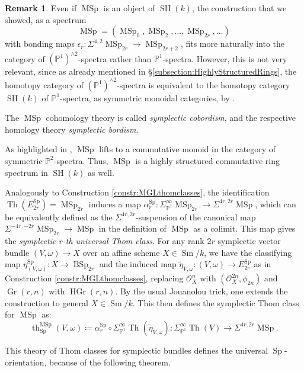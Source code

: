 \documentclass[10pt]{amsart}
\theoremstyle{definition}
\newtheorem{rmk}[defn]{Remark}
\theoremstyle{plain}
\numberwithin{equation}{section}
\newcommand{\0}{\emptyset}
\renewcommand{\P}{{\mathbb P}}
\newcommand{\MSp}{{\operatorname{MSp}}}
\newcommand{\BSp}{{\operatorname{BSp}}}
\newcommand{\Sp}{{\operatorname{Sp}}}
\newcommand{\Gr}{{\operatorname{Gr}}}
\newcommand{\HGr}{{\operatorname{HGr}}}
\newcommand{\SH}{{\operatorname{SH}}}
\newcommand{\Th}{{\operatorname{Th}}}
\newcommand{\Sm}{{\operatorname{Sm}}}
\renewcommand{\th}{{\operatorname{th}}}
\begin{document}
\begin{rmk}
    Even if $\MSp$ is an object of $\SH(k)$, the construction that we showed, as a spectrum
    $$\MSp=(\MSp_0, \MSp_2, \ldots, \MSp_{2r}, \ldots)$$
    with bonding maps $\epsilon_r:\Sigma^{4,2}\MSp_{2r} \to \MSp_{2r+2}$, fits more naturally into the category of $(\P^1)^{\wedge 2}$-spectra rather than $\P^1$-spectra. However, this is not very relevant, since as already mentioned in \S \ref{subsection:HighlyStructuredRings}, the homotopy category of $(\P^1)^{\wedge 2}$-spectra is equivalent to the homotopy category $\SH(k)$ of $\P^1$-spectra, as symmetric monoidal categories, by \cite[Theorem 3.2]{Panwal-cobordism}.
\end{rmk}

The $\MSp$ cohomology theory is called \emph{symplectic cobordism}, and the respective homology theory \emph{symplectic bordism}.  

As highlighted in \cite[Section 6]{Panwal-cobordism}, $\MSp$ lifts to a commutative monoid in the category of symmetric $\P^2$-spectra. Thus, $\MSp$ is a highly structured commutative ring spectrum in $\SH(k)$ as well.

Analogously to Construction \ref{constr:MGLthomclasses}, the identification $\Th(E_{2r}^\Sp)=\MSp_{2r}$ induces a map $\alpha_r^\Sp: \Sigma_{\P^1}^\infty \MSp_{2r}\to \Sigma^{4r,2r}\MSp$, which can be equivalently defined as the $\Sigma^{4r,2r}$-suspension of the canonical map $\Sigma^{-4r,-2r}\MSp_{2r} \to \MSp$ in the definition of $\MSp$ as a colimit. This map gives the \emph{symplectic $r$-th universal Thom class}. For any rank $2r$ symplectic vector bundle $(V,\omega)\to X$ over an affine scheme $X \in \Sm/k$, we have the classifying map $\eta^\Sp_{(V,\omega)}:X \to \BSp_{2r}$ and the induced map $\tilde{\eta}_{V,\omega}:(V,\omega)\to E_{2r}^\Sp$ as in Construction \ref{constr:MGLthomclasses}, replacing $\mathcal{O}_X^n$ with $(\mathcal{O}_X^{2n},\phi_{2n})$ and $\Gr(r,n)$ with $\HGr(r,n)$. By the usual Jouanolou trick, one extends the construction to general $X \in \Sm/k$. This then defines the symplectic Thom class for $\MSp$ as:
\begin{equation}
    \label{eq:MSpThomclass}
    \th_\Sp^\MSp(V,\omega) \coloneqq \alpha_r^\Sp \circ \Sigma_{\P^1}^\infty \Th(\tilde{\eta}_{V,\omega}): \Sigma_{\P^1}^\infty \Th(V) \to \Sigma^{4r,2r}\MSp.
\end{equation}

This theory of Thom classes for symplectic bundles defines the universal $\Sp$-orientation, because of the following theorem.
\end{document}
